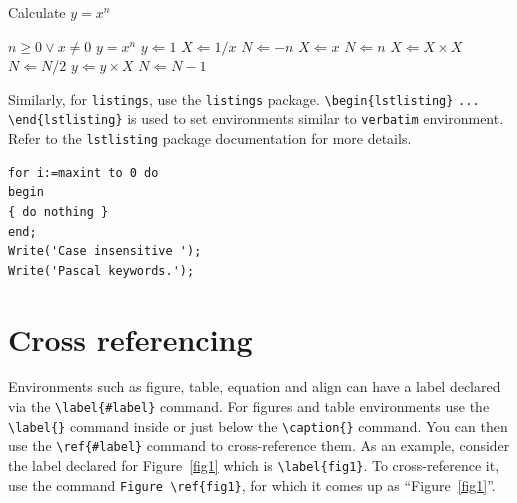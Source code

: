 \documentclass[default,pdflatex,iicol]{sn-jnl}%
\begin{document}
\begin{algorithm}
\caption{Calculate $y = x^n$}\label{algo1}
\begin{algorithmic}[1]
\Require $n \geq 0 \vee x \neq 0$
\Ensure $y = x^n$ 
\State $y \Leftarrow 1$
\label{algln2}
        \State $X \Leftarrow 1 / x$
        \State $N \Leftarrow -n$
\Else
        \State $X \Leftarrow x$
        \State $N \Leftarrow n$
\EndIf
{}
            \State $X \Leftarrow X \times X$
            \State $N \Leftarrow N / 2$
        \Else[$N$ is odd]
            \State $y \Leftarrow y \times X$
            \State $N \Leftarrow N - 1$
        \EndIf
\EndWhile
\end{algorithmic}
\end{algorithm}
\bigskip

Similarly, for \verb+listings+, use the \verb+listings+ package. \verb+\begin{lstlisting}+ \verb+...+ \verb+\end{lstlisting}+ is used to set environments similar to \verb+verbatim+ environment. Refer to the \verb+lstlisting+ package documentation for more details.

\bigskip
\begin{minipage}{\hsize}%
\lstset{frame=single,framexleftmargin=-1pt,framexrightmargin=-17pt,framesep=12pt,linewidth=0.98\textwidth,language=pascal}%
\begin{lstlisting}
for i:=maxint to 0 do
begin
{ do nothing }
end;
Write('Case insensitive ');
Write('Pascal keywords.');
\end{lstlisting}
\end{minipage}

\section{Cross referencing}\label{sec8}

Environments such as figure, table, equation and align can have a label
declared via the \verb+\label{#label}+ command. For figures and table
environments use the \verb+\label{}+ command inside or just
below the \verb+\caption{}+ command. You can then use the
\verb+\ref{#label}+ command to cross-reference them. As an example, consider
the label declared for Figure~\ref{fig1} which is
\verb+\label{fig1}+. To cross-reference it, use the command 
\verb+Figure \ref{fig1}+, for which it comes up as
``Figure~\ref{fig1}''. 
\end{document}

